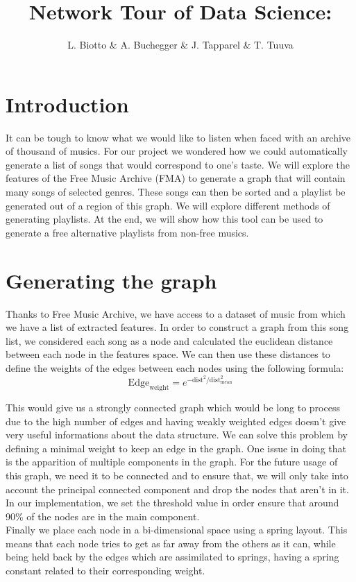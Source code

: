 \documentclass[11pt,a4paper,twoside]{article}
\title{\textbf{\huge{Network Tour of Data Science: }}\\\vspace{0.5cm}\normalfont{Free Music Alternative Playlists}}
\author{\LARGE{L. Biotto \& A. Buchegger \& J. Tapparel \& T. Tuuva}}
\date{}
\begin{document}
\maketitle

\section{Introduction}

It can be tough to know what we would like to listen when faced with an archive of thousand of musics. For our project we wondered how we could automatically generate a list of songs that would correspond to one's taste. We will explore the features of the Free Music Archive (FMA) to generate a graph that will contain many songs of selected genres. These songs can then be sorted and a playlist be generated out of a region of this graph. We will explore different methods of generating playlists. At the end, 
we will show how this tool can be used to generate a free alternative playlists from non-free musics.

\section{Generating the graph}
Thanks to Free Music Archive, we have access to a dataset of music from which we have a list of extracted features. In order to construct a graph from this song list, we considered each song as a node and calculated the euclidean distance between each node in the features space. We can then use these distances to define the weights of the edges between each nodes using the following formula:
$$
\text{Edge}_{\text{weight}}=e^{-\text{dist}^2/\text{dist}_{\text{mean}}^2}
$$

This would give us a strongly connected graph which would be long to process due to the high number of edges and having weakly weighted edges doesn't give very useful informations about the data structure. We can solve this problem by defining a minimal weight to keep an edge in the graph. One issue in doing that is the apparition of multiple components in the graph. For the future usage of this graph, we need it to be connected and to ensure that, we will only take into account the principal connected component and drop the nodes that aren't in it. In our implementation, we set the threshold value in order ensure that around 90\% of the nodes are in the main component.\\

Finally we place each node in a bi-dimensional space using a spring layout. This means that each node tries to get as far away from the others as it can, while being held back by the edges which are assimilated to springs, having a spring constant related to their corresponding weight.\\
\end{document}
